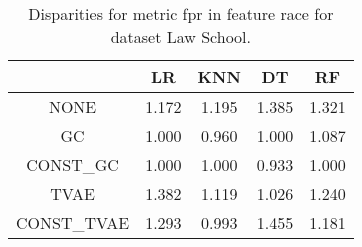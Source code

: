 \begin{table}
\caption{Disparities for metric fpr in feature race for dataset Law School.}
\label{tab:disp-LAW SCHOOL-race-fpr}
\begin{tabular}{ccccc}
\toprule
 & LR & KNN & DT & RF \\
\midrule
NONE & 1.172 & 1.195 & 1.385 & 1.321 \\
GC & 1.000 & 0.960 & 1.000 & 1.087 \\
CONST\_GC & 1.000 & 1.000 & 0.933 & 1.000 \\
TVAE & 1.382 & 1.119 & 1.026 & 1.240 \\
CONST\_TVAE & 1.293 & 0.993 & 1.455 & 1.181 \\
\bottomrule
\end{tabular}
\end{table}
